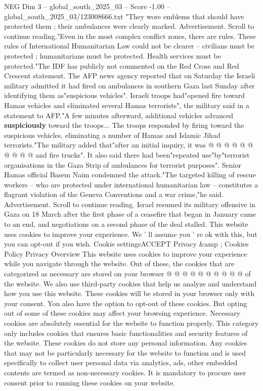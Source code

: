\begin{textsample}{NEG Dim 3 – global\_south\_2025\_03 – Score -1.00 – global\_south\_2025\_03/123008666.txt}  \label{ex:f3_neg_419}
"They wore emblems that should have protected them ; their ambulances were clearly marked.
Advertisement.
Scroll to continue reading."Even in the most complex conflict zones, there are rules.
These rules of International Humanitarian Law could not be clearer -- civilians must be protected ; humanitarians must be protected.
Health services must be protected."The IDF has publicly not commented on the Red Cross and Red Crescent statement.
The AFP news agency reported that on Saturday the Israeli military admitted it had fired on ambulances in southern Gaza last Sunday after identifying them as"suspicious vehicles".
Israeli troops had"opened fire toward Hamas vehicles and eliminated several Hamas terrorists", the military said in a statement to AFP."A few minutes afterward, additional vehicles advanced \textbf{suspiciously} toward the troops...
The troops responded by firing toward the suspicious vehicles, eliminating a number of Hamas and Islamic Jihad terrorists."The military added that"after an initial inquiry, it was @ @ @ @ @ @ @ @ @ @ and fire trucks".
It also said there had been"repeated use"by"terrorist organisations in the Gaza Strip of ambulances for terrorist purposes".
Senior Hamas official Basem Naim condemned the attack."The targeted killing of rescue workers -- who are protected under international humanitarian law -- constitutes a flagrant violation of the Geneva Conventions and a war crime,"he said.
Advertisement.
Scroll to continue reading.
Israel resumed its military offensive in Gaza on 18 March after the first phase of a ceasefire that began in January came to an end, and negotiations on a second phase of the deal stalled.
This website uses cookies to improve your experience.
We ' ll assume you ' re ok with this, but you can opt-out if you wish.
Cookie settingsACCEPT Privacy \&amp ; Cookies Policy Privacy Overview This website uses cookies to improve your experience while you navigate through the website.
Out of these, the cookies that are categorized as necessary are stored on your browser @ @ @ @ @ @ @ @ @ @ of the website.
We also use third-party cookies that help us analyze and understand how you use this website.
These cookies will be stored in your browser only with your consent.
You also have the option to opt-out of these cookies.
But opting out of some of these cookies may affect your browsing experience.
Necessary cookies are absolutely essential for the website to function properly.
This category only includes cookies that ensures basic functionalities and security features of the website.
These cookies do not store any personal information.
Any cookies that may not be particularly necessary for the website to function and is used specifically to collect user personal data via analytics, ads, other embedded contents are termed as non-necessary cookies.
It is mandatory to procure user consent prior to running these cookies on your website.

\end{textsample}
